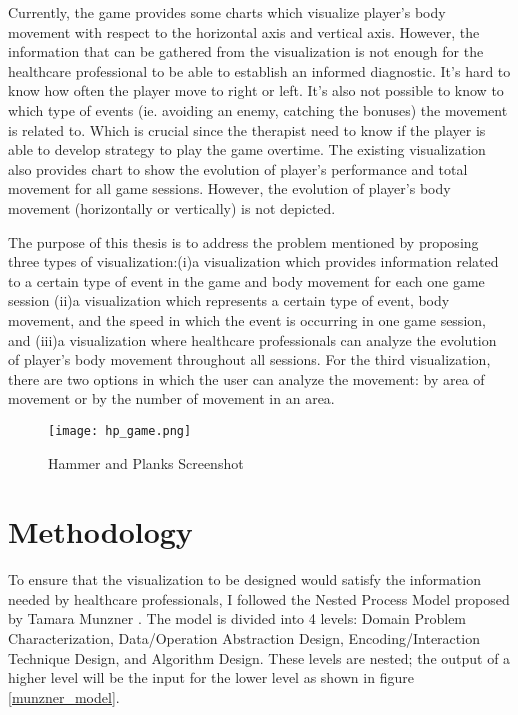 Currently, the game provides some charts which visualize player's body movement with respect to the horizontal axis and vertical axis. However, the information that can be gathered from the visualization is not enough for the healthcare professional to be able to establish an informed diagnostic. It's hard to know how often the player move to right or left. It's also not possible to know to which type of events (ie. avoiding an enemy, catching the bonuses) the movement is related to. Which is crucial since the therapist need to know if the player is able to develop strategy to play the game overtime. The existing visualization also provides chart to show the evolution of player's performance and total movement for all game sessions. However, the evolution of player's body movement (horizontally or vertically) is not depicted.

The purpose of this thesis is to address the problem mentioned by proposing three types of visualization:(i)a visualization which provides information related to a certain type of event in the game and body movement for each one game session (ii)a visualization which represents a certain type of event, body movement, and the speed in which the event is occurring in one game session, and (iii)a visualization where healthcare professionals can analyze the evolution of player's body movement throughout all sessions. For the third visualization, there are two options in which the user can analyze the movement: by area of movement or by the number of movement in an area.

\begin{figure}
\centering
\texttt{[image: hp\_game.png]}
\caption{Hammer and Planks Screenshot \label{game_screenshot}}
\end{figure}


\section{Methodology}

To ensure that the visualization to be designed would satisfy the information needed by healthcare professionals, I followed the Nested Process Model proposed by Tamara Munzner \cite{Munzner:2009:NMV:1638611.1639181}. The model is divided into 4 levels: Domain Problem Characterization, Data/Operation Abstraction Design, Encoding/Interaction Technique Design, and Algorithm Design. These levels are nested; the output of a higher level will be the input for the lower level as shown in figure \ref{munzner_model}.

